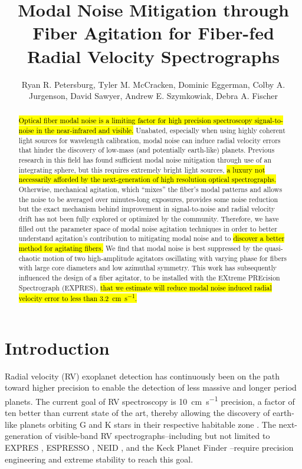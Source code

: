 \documentclass[twocolumn]{emulateapj}
\begin{document}
\title{Modal Noise Mitigation through Fiber Agitation for Fiber-fed Radial Velocity Spectrographs}

\author{Ryan R. Petersburg, Tyler M. McCracken, Dominic Eggerman, Colby A. Jurgenson, David Sawyer, Andrew E. Szymkowiak, Debra A. Fischer}

\begin{abstract}

\hl{Optical fiber modal noise is a limiting factor for high precision spectroscopy signal-to-noise in the near-infrared and visible.} Unabated, especially when using highly coherent light sources for wavelength calibration, modal noise can induce radial velocity errors that hinder the discovery of low-mass (and potentially earth-like) planets. Previous research in this field has found sufficient modal noise mitigation through use of an integrating sphere, but this requires extremely bright light sources, \hl{a luxury not necessarily afforded by the next-generation of high resolution optical spectrographs.} Otherwise, mechanical agitation, which ``mixes'' the fiber's modal patterns and allows the noise to be averaged over minutes-long exposures, provides some noise reduction but the exact mechanism behind improvement in signal-to-noise and radial velocity drift has not been fully explored or optimized by the community. Therefore, we have filled out the parameter space of modal noise agitation techniques in order to better understand agitation's contribution to mitigating modal noise and to \hl{discover a better method for agitating fibers.} We find that modal noise is best suppressed by the quasi-chaotic motion of two high-amplitude agitators oscillating with varying phase for fibers with large core diameters and low azimuthal symmetry. This work has subsequently influenced the design of a fiber agitator, to be installed with the EXtreme PREcision Spectrograph (EXPRES), \hl{that we estimate will reduce modal noise induced radial velocity error to less than {\SI{3.2}{\centi\meter\per\second}}.}

\end{abstract}


\section{Introduction}
\label{sec:intro}

Radial velocity (RV) exoplanet detection has continuously been on the path toward higher precision to enable the detection of less massive and longer period planets. The current goal of RV spectroscopy is \SI{10}{\centi\meter\per\second} precision, a factor of ten better than current state of the art, thereby allowing the discovery of earth-like planets orbiting G and K stars in their respective habitable zone \citep{Fischer2016}. The next-generation of visible-band RV spectrographs--including but not limited to EXPRES \citep{Jurgenson2016}, ESPRESSO \citep{Megevand2012}, NEID \citep{Schwab2016}, and the Keck Planet Finder \citep{Gibson2016}--require precision engineering and extreme stability to reach this goal.
\end{document}
